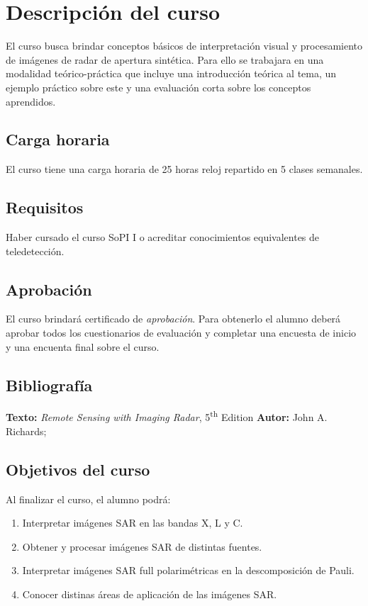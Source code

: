 
\chapter{Descripción del curso}

El curso busca brindar conceptos básicos de interpretación visual y procesamiento de imágenes de radar de apertura sintética. Para ello se trabajara en una modalidad teórico-práctica que incluye una introducción teórica al tema, un ejemplo práctico sobre este y una evaluación corta sobre los conceptos aprendidos.

\section*{Carga horaria}
El curso tiene una carga horaria de 25 horas reloj repartido en 5 clases semanales.

\section*{Requisitos} Haber cursado el curso SoPI I o acreditar conocimientos
equivalentes de teledetección.

\section*{Aprobación} El curso brindará certificado de \emph{aprobación}. Para obtenerlo el alumno deberá aprobar todos los cuestionarios de evaluación y completar una encuesta de inicio y una encuenta final sobre el curso.

\section*{Bibliografía}
\textbf {\large Texto:} \emph{Remote Sensing with Imaging Radar},
5\textsuperscript{th} Edition
\textbf {Autor:} John A. Richards; \\

\section*{Objetivos del curso}
Al finalizar el curso, el alumno podrá:
\begin{enumerate} \itemsep-0.4em
  \item Interpretar imágenes SAR en las bandas X, L y C.
  \item Obtener y procesar imágenes SAR de distintas fuentes.
  \item Interpretar imágenes SAR full polarimétricas en la descomposición de Pauli.
  \item Conocer distinas áreas de aplicación de las imágenes SAR.
\end{enumerate}


